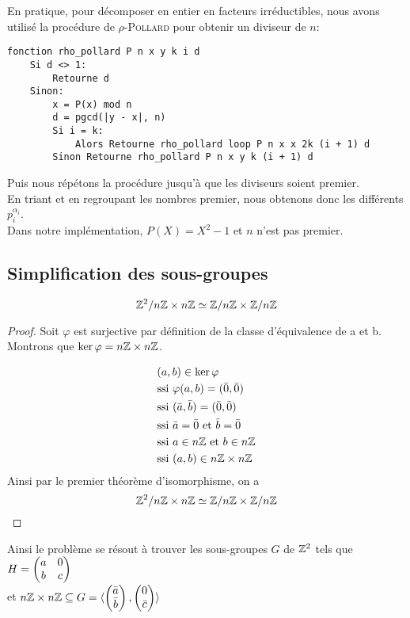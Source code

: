 \documentclass[11pt]{article}
\begin{document}
En pratique, pour décomposer en entier en facteurs irréductibles, nous avons utilisé la procédure de
\textsc{$\rho$-Pollard} pour obtenir un diviseur de $n$:
\begin{verbatim}
fonction rho_pollard P n x y k i d
    Si d <> 1:
        Retourne d
    Sinon:
        x = P(x) mod n
        d = pgcd(|y - x|, n)
        Si i = k:
            Alors Retourne rho_pollard loop P n x x 2k (i + 1) d
        Sinon Retourne rho_pollard P n x y k (i + 1) d
\end{verbatim}
Puis nous répétons la procédure jusqu'à que les diviseurs soient premier.\\
En triant et en regroupant les nombres premier, nous obtenons donc les différents $p^{\alpha_i}_i$.\\
Dans notre implémentation, $P(X) = X^2 - 1$ et $n$ n'est pas premier.

\newpage
\subsection{Simplification des sous-groupes}

\begin{proposition}
	$$\mathbb Z^2/n\mathbb Z \times n\mathbb Z \simeq \mathbb Z/n\mathbb Z \times \mathbb Z/n\mathbb Z $$
\end{proposition}
\begin{proof}
	Soit 
$\varphi$ est surjective par définition de la classe d'équivalence de a et b.
Montrons que $\ker \varphi = n\mathbb Z \times n\mathbb Z$.

\begin{equation*}
	\begin{split}
		&(a,b) \in \ker \varphi \\
		&\text{ssi } \varphi(a,b) = (\bar 0, \bar 0)\\
		&\text{ssi } (\bar a, \bar b) = (\bar 0, \bar 0)\\
		&\text{ssi } \bar a = \bar 0 \text{ et } \bar b = \bar 0\\
		&\text{ssi } a \in n\mathbb Z \text{ et } b \in n\mathbb Z\\
		&\text{ssi } (a,b) \in  n\mathbb Z \times n\mathbb Z
	\end{split}
\end{equation*}
Ainsi par le premier théorème d'isomorphisme, on a
$$\mathbb Z^2/n\mathbb Z \times n\mathbb Z \simeq \mathbb Z/n\mathbb Z \times \mathbb Z/n\mathbb Z $$
\end{proof}
Ainsi le problème se résout à trouver les sous-groupes $G$ de $\mathbb Z^2$ tels que
$H = \begin{pmatrix} a & 0\\ b & c \end{pmatrix}$\\
et
$n\mathbb Z \times n\mathbb Z \subseteq G = \langle \begin{pmatrix} \bar a\\ \bar b \end{pmatrix}, \begin{pmatrix} 0\\ \bar c \end{pmatrix} \rangle$
\end{document}
